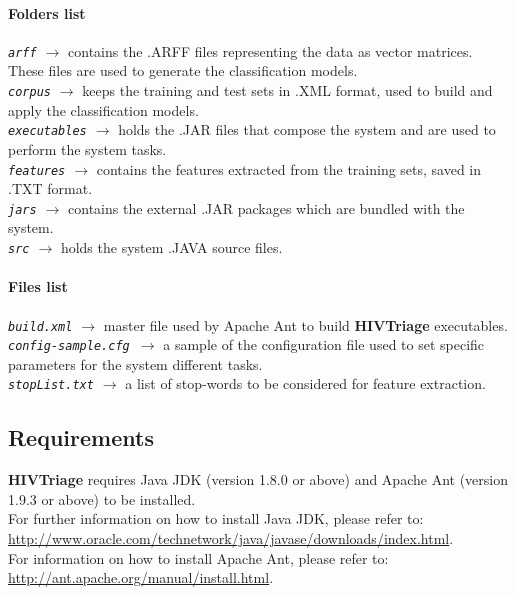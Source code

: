 \documentclass[11pt]{article}
\newcommand{\system}{{\bf{HIVTriage}}}
\newcommand{\configsample}{\texttt{config-sample.cfg{ }}}
\begin{document}
\paragraph{Folders list} 
\textit{\texttt{arff} $\rightarrow$} contains the .ARFF files representing the data as vector matrices. These files are used to generate the classification models. \\
\textit{\texttt{corpus} $\rightarrow$} keeps the training and test sets in .XML format, used to build and apply the classification models. \\
\textit{\texttt{executables} $\rightarrow$} holds the .JAR files that compose the system and are used to perform the system tasks. \\
\textit{\texttt{features} $\rightarrow$} contains the features extracted from the training sets, saved in .TXT format. \\
\textit{\texttt{jars} $\rightarrow$} contains the external .JAR packages which are bundled with the system.\\
\textit{\texttt{src} $\rightarrow$} holds the system .JAVA source files. 

\paragraph{Files list} 
\textit{\texttt{build.xml} $\rightarrow$} master file used by Apache Ant to build \system{} executables. \\
\textit{\configsample $\rightarrow$} a sample of the configuration file used to set specific parameters for the system different tasks. \\
\textit{\texttt{stopList.txt} $\rightarrow$} a list of stop-words to be considered for feature extraction.

\subsection{Requirements}
\system{} requires Java JDK (version 1.8.0 or above)  and Apache Ant (version 1.9.3 or above) to be installed.\\
For further information on how to install Java JDK, please refer to: \\ \url{http://www.oracle.com/technetwork/java/javase/downloads/index.html}. \\
For information on how to install Apache Ant, please refer to: \\ \url{http://ant.apache.org/manual/install.html}.
\end{document}

